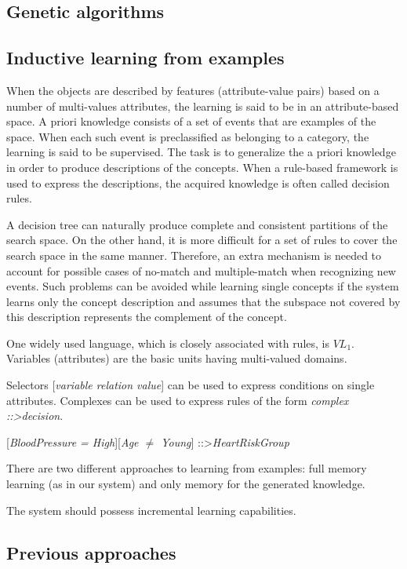 \documentclass[12pt]{article}
\begin{document}
\subsection{Genetic algorithms}

\subsection{Inductive learning from examples}
When the objects are described by features (attribute-value pairs) based on a number of multi-values attributes, the learning is said to be in an attribute-based space. A priori knowledge consists of a set of events that are examples of the space. When each such event is preclassified as belonging to a category, the learning is said to be supervised. The task is to generalize the a priori knowledge in order to produce descriptions of the concepts. When a rule-based framework is used to express the descriptions, the acquired knowledge is often called decision rules.

A decision tree can naturally produce complete and consistent partitions of the search space. On the other hand, it is more difficult for a set of rules to cover the search space in the same manner. Therefore, an extra mechanism is needed to account for possible cases of no-match and multiple-match when recognizing new events. Such problems can be avoided while learning single concepts if the system learns only the concept description and assumes that the subspace not covered by this description represents the complement of the concept.

One widely used language, which is closely associated with rules, is $VL_1$. Variables (attributes) are the basic units having multi-valued domains.

Selectors [\textit{variable relation value}] can be used to express conditions on single attributes. Complexes can be used to express rules of the form \textit{complex ::\textgreater decision}.
\begin{center}
[\textit{BloodPressure = High}][\textit{Age $\ne$ Young}] ::\textgreater \textit{HeartRiskGroup}
\end{center}

There are two different approaches to learning from examples: full memory learning (as in our system) and only memory for the generated knowledge.

The system should possess incremental learning capabilities.

\subsection{Previous approaches}
\end{document}
